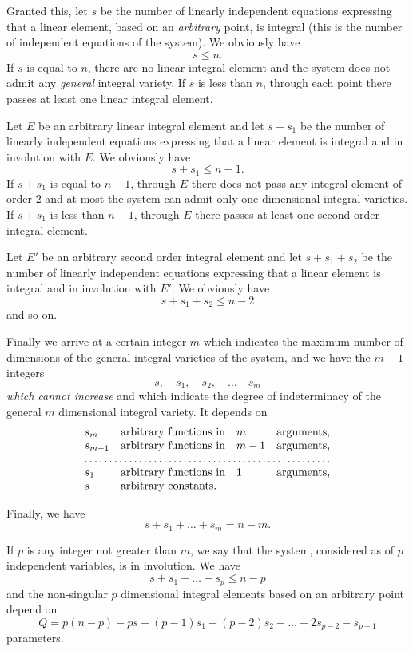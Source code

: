 \documentclass[leqno,11pt]{book}
\theoremstyle{shape1}
\theoremstyle{shapesmall}
\begin{document}
Granted this, let $s$ be the number of linearly independent equations expressing that a linear element, based on an \emph{arbitrary} point, is integral (this is the number of independent equations of the system). We obviously have
\[
s\le n.
\]
If $s$ is equal to $n$, there are no linear integral element and the system does not admit any \emph{general} integral variety. If $s$ is less than $n$, through each point there passes at least one linear integral element.

Let $E$ be an arbitrary linear integral element and let $s+s_{1}$ be the number of linearly independent equations expressing that a linear element is integral and in involution with $E$. We obviously have
\[
s+s_{1}\le n-1.
\]
If $s+s_{1}$ is equal to $n-1$, through $E$ there does not pass any integral element of order $2$ and at most the system can admit only one dimensional integral varieties. If $s+s_{1}$ is less than $n-1$, through $E$ there passes at least one second order integral element.

Let $E'$ be an arbitrary second order integral element and let $s+s_{1}+s_{2}$ be the number of linearly independent equations expressing that a linear element is integral and in involution with $E'$. We obviously have
\[
s+s_{1}+s_{2}\le n-2
\]
and so on.

Finally we arrive at a certain integer $m$ which indicates the maximum number of dimensions of the general integral varieties of the system, and we have the $m+1$ integers
\[
s,\quad s_{1},\quad s_{2},\quad\dots\quad s_{m}
\]
\emph{which cannot increase} and which indicate the degree of indeterminacy of the general $m$ dimensional integral variety. It depends on
\[
\begin{matrix*}[l]
  s_{m}&\text{arbitrary functions in}&m&\text{arguments,}\\
  s_{m-1}&\text{arbitrary functions in}&m-1&\text{arguments,}\\
  \hdotsfor{4}\\
  s_{1}&\text{arbitrary functions in}&1&\text{arguments,}\\
  s&\text{arbitrary constants.}&&
\end{matrix*}
\]

Finally, we have
\[
s+s_{1}+\dots+s_{m}=n-m.
\]

If $p$ is any integer not greater than $m$, we say that the system, considered as of $p$ independent variables, is in involution. We have
\begin{equation}
  \label{eq:p8}
  s+s_{1}+\dots+s_{p}\le n-p
\end{equation}
and the non-singular $p$ dimensional integral elements based on an arbitrary point depend on
\[
Q=p(n-p)-ps-(p-1)s_{1}-(p-2)s_{2}-\dots-2s_{p-2}-s_{p-1}
\]
parameters.
\end{document}
